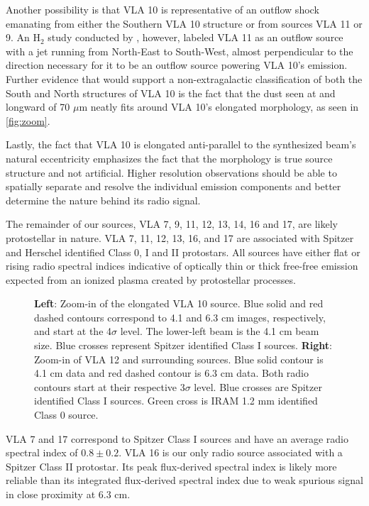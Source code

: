 \documentclass[apj]{emulateapj}
\begin{document}
Another possibility is that VLA 10 is representative of an outflow shock emanating from either the Southern VLA 10 structure or from sources VLA 11 or 9. An H$_{2}$ study conducted by \citet{Teixeira12}, however, labeled VLA 11 as an outflow source with a jet running from North-East to South-West, almost perpendicular to the direction necessary for it to be an outflow source powering VLA 10's emission. Further evidence that would support a non-extragalactic classification of both the South and North structures of VLA 10 is the fact that the dust seen at and longward of 70 $\mu$m neatly fits around VLA 10's elongated morphology, as seen in \autoref{fig:zoom}. 

Lastly, the fact that VLA 10 is elongated anti-parallel to the synthesized beam's natural eccentricity emphasizes the fact that the morphology is true source structure and not artificial. Higher resolution observations should be able to spatially separate and resolve the individual emission components and better determine the nature behind its radio signal.

The remainder of our sources, VLA 7, 9, 11, 12, 13, 14, 16 and 17, are likely protostellar in nature. VLA 7, 11, 12, 13, 16, and 17 are associated with Spitzer and Herschel identified Class 0, I and II protostars. All sources have either flat or rising radio spectral indices indicative of optically thin or thick free-free emission expected from an ionized plasma created by protostellar processes.

\begin{figure*}
\label{fig:vla10 and vla12}
\caption{
{\bfseries Left}: Zoom-in of the elongated VLA 10 source. Blue solid and red dashed contours correspond to 4.1 and 6.3 cm images, respectively, and start at the 4$\sigma$ level. The lower-left beam is the 4.1 cm beam size. Blue crosses represent Spitzer identified Class I sources.
{\bfseries Right}: Zoom-in of VLA 12 and surrounding sources. Blue solid contour is 4.1 cm data and red dashed contour is 6.3 cm data. Both radio contours start at their respective 3$\sigma$ level. Blue crosses are Spitzer identified Class I sources. Green cross is IRAM 1.2 mm identified Class 0 source.
}
\end{figure*}

VLA 7 and 17 correspond to Spitzer Class I sources and have an average radio spectral index of $0.8 \pm 0.2$. VLA 16 is our only radio source associated with a Spitzer Class II protostar. Its peak flux-derived spectral index is likely more reliable than its integrated flux-derived spectral index due to weak spurious signal in close proximity at 6.3 cm.
\end{document}
